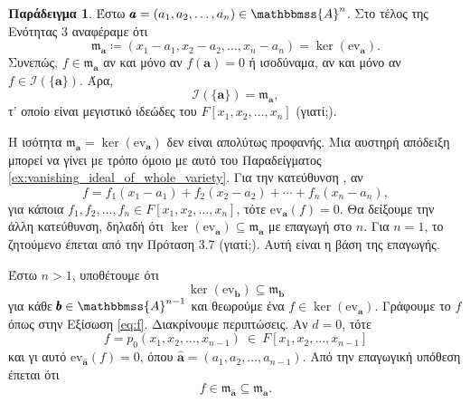 \documentclass[12pt,a4paper,reqno]{amsart}
\theoremstyle{definition}
\newtheorem{example}[theorem]{Παράδειγμα}
\theoremstyle{remark}
\numberwithin{theorem}{section}
\numberwithin{exercise}{section}
\numberwithin{equation}{section}
\renewcommand{\AA}{\mathbbmss{A}}
\newcommand{\fm}{\mathfrak{m}}
\newcommand{\iI}{\mathcal{I}}
\newcommand{\bfa}{\pmb{a}}
\newcommand{\bfb}{\pmb{b}}
\newcommand{\ev}{\mathrm{ev}}
\newcommand{\Pol}[1]{F[x_1, x_2, \dots, x_{#1}]}
\begin{document}
\begin{example}
    \label{ex:vanishing_ideal_of_a_point}
    Έστω $\bfa = (a_1, a_2, \dots, a_n) \in \AA^n$. Στο τέλος της Ενότητας 3 αναφέραμε ότι 
    \[
    \fm_{\bfa} \coloneqq \left(
        x_1-a_1, x_2-a_2, \dots, x_n-a_n
    \right) = \ker\left(\ev_{\bfa}\right).
    \]
    Συνεπώς, $f \in \fm_{\bfa}$ αν και μόνο αν $f(\bfa) = 0$ ή ισοδύναμα, αν και μόνο αν $f \in \iI(\{\bfa\})$. Άρα, 
    \[
    \iI(\{\bfa\}) = \fm_{\bfa},
    \]
    τ' οποίο είναι μεγιστικό ιδεώδες του $\Pol{n}$ (γιατί;).


    Η ισότητα $\fm_{\bfa} = \ker(\ev_{\bfa})$ δεν είναι απολύτως προφανής. Μια αυστηρή απόδειξη μπορεί να γίνει με τρόπο όμοιο με αυτό του Παραδείγματος \ref{ex:vanishing_ideal_of_whole_variety}. Για την κατεύθυνση \textquote{$\subseteq$}, αν 
    \[
    f = f_1(x_1-a_1) + f_2(x_2-a_2) + \cdots + f_n(x_n-a_n),
    \]
    για κάποια $f_1, f_2, \dots, f_n \in \Pol{n}$, τότε $\ev_{\bfa}(f) = 0$. Θα δείξουμε την άλλη κατεύθυνση, δηλαδή ότι $\ker(\ev_{\bfa}) \subseteq \fm_{\bfa}$ με επαγωγή στο $n$. Για $n=1$, το ζητούμενο έπεται από την Πρόταση 3.7 (γιατί;). Αυτή είναι η βάση της επαγωγής. 
    
    Έστω $n > 1$, υποθέτουμε ότι 
    \[
    \ker(\ev_{\bfb}) \subseteq \fm_{\bfb}
    \] 
    για κάθε $\bfb \in \AA^{n-1}$ και θεωρούμε ένα $f \in \ker(\ev_{\bfa})$. Γράφουμε το $f$ όπως στην Εξίσωση \eqref{eq:f}. Διακρίνουμε περιπτώσεις. Αν $d=0$, τότε 
    \[
    f = p_0(x_1,x_2,\dots, x_{n-1}) \ \in \ \Pol{n-1}
    \]
    και γι αυτό $\ev_{\hat{\bfa}}(f) = 0$, όπου $\hat{\bfa} = (a_1, a_2, \dots, a_{n-1})$. Από την επαγωγική υπόθεση έπεται ότι 
    \[
    f \in \fm_{\hat{\bfa}} \subseteq \fm_{\bfa}.
    \]


\end{example}
\end{document}
